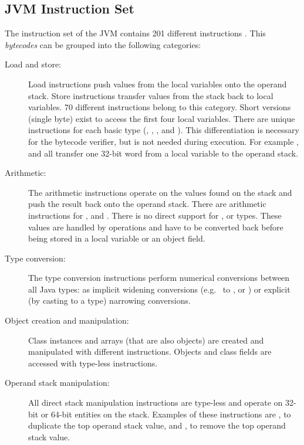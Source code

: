 \subsection{JVM Instruction Set}

The instruction set of the JVM contains 201 different instructions
\cite{jvm}. This \emph{bytecodes} can be grouped into the following
categories:
%
\begin{description}
    \item[Load and store:]
Load instructions push values from the local variables onto the
operand stack. Store instructions transfer values from the stack
back to local variables. 70 different instructions belong to this
category. Short versions (single byte) exist to access the first
four local variables. There are unique instructions for each basic
type (, , ,  and
). This differentiation is necessary for the
bytecode verifier, but is not needed during execution. For example
,  and  all transfer one 32-bit
word from a local variable to the operand stack.

    \item[Arithmetic:]
The arithmetic instructions operate on the values found on the stack
and push the result back onto the operand stack. There are
arithmetic instructions for ,  and
. There is no direct support for ,
 or  types. These values are handled by
 operations and have to be converted back before being
stored in a local variable or an object field.

    \item[Type conversion:]
The type conversion instructions perform numerical conversions
between all Java types: as implicit widening conversions (e.g.\
 to ,  or ) or
explicit (by casting to a type) narrowing conversions.

    \item[Object creation and manipulation:]
Class instances and arrays (that are also objects) are created and
manipulated with different instructions. Objects and class fields
are accessed with type-less instructions.

    \item[Operand stack manipulation:]
All direct stack manipulation instructions are type-less and
operate on 32-bit or 64-bit entities on the stack. Examples of these
instructions are \code{dup}, to duplicate the top operand stack
value, and , to remove the top operand stack value.


\end{description}
